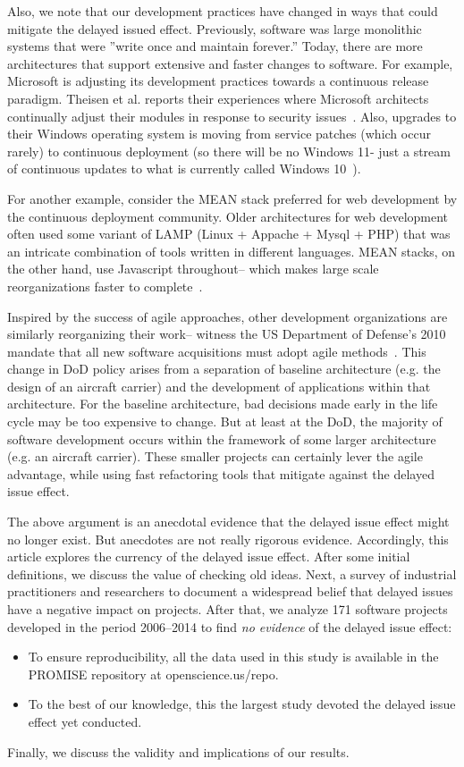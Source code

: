 \documentclass{sig-alternate}
\newcommand{\bi}{\begin{itemize}}%
\newcommand{\ei}{\end{itemize}}
\begin{document}
Also, we note that our development practices have changed in ways that could   mitigate the delayed issued effect.  Previously,
software was large monolithic systems that were ''write once and maintain
forever.'' Today, there are more architectures that
support  extensive and faster changes to software. 
For example, 
Microsoft is adjusting its development practices towards a continuous
release paradigm. Theisen et al. reports their experiences where Microsoft architects
continually adjust  their modules in response to security issues~\cite{Theisen15}.
Also, upgrades to their Windows operating system is moving from service patches (which occur rarely) to continuous deployment (so there will be no Windows 11- just a stream of continuous updates to what is currently called Windows 10~\cite{bright15}).

For another example, consider the MEAN stack preferred for web development by
the continuous deployment community. Older architectures for web development
often used some variant of LAMP (Linux + Appache + Mysql + PHP) that was an intricate
combination of tools written in different languages. MEAN stacks, on the other hand,
use Javascript throughout-- which makes large scale reorganizations faster to complete~\cite{wayner15}. 

Inspired by the success of agile approaches, other  development organizations are similarly reorganizing their work-- witness the US Department of Defense's 2010 mandate
that all new software acquisitions must adopt agile methods~\cite{kim13}. 
This change in DoD policy arises from a separation of baseline architecture
(e.g. the design of an 
aircraft carrier) and the development of applications within that architecture.
For the baseline architecture, bad decisions
made  early in the life cycle may be too expensive to change.
But at least at the DoD, the majority of software development occurs within
the framework of some larger architecture (e.g. an aircraft carrier).
These smaller projects can certainly lever the agile advantage, while 
using fast refactoring tools that mitigate against  the delayed issue effect.

The above argument is an anecdotal evidence that  the delayed issue effect might no longer exist. But anecdotes are not really rigorous
evidence. Accordingly,  this article explores the currency of the delayed issue effect.
After some initial definitions, we discuss the
value of checking old ideas. Next, a survey of industrial practitioners and researchers to document a widespread belief that delayed issues have a negative impact on projects.  After that, we  analyze 171 software  projects developed in the period 2006--2014 to find  {\em no evidence} of the delayed issue effect:
\bi
\item
To ensure reproducibility,
all the data  used in this study is available in the PROMISE
repository at openscience.us/repo. 
\item
To the best of our knowledge,
this the largest study devoted the delayed issue effect yet conducted.
\ei
Finally, we discuss the validity and implications of our results.
 
\end{document}
